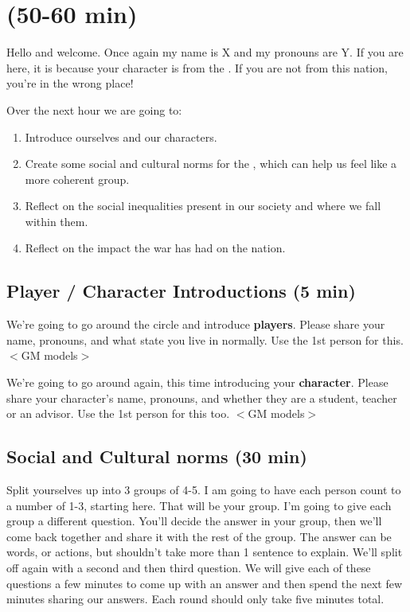 \documentclass[green]{GL2020}
\begin{document}
\name{\gPreGameCoS{}}

\section*{(50-60 min)}

Hello and welcome. Once again my name is X and my pronouns are Y. If you are here, it is because your character is from the \pFarm{}. If you are not from this nation, you're in the wrong place!

Over the next hour we are going to:
\begin{enumerate}
	\item Introduce ourselves and our characters.
	\item Create some social and cultural norms for the \pFarm{}, which can help us feel like a more coherent group.
	\item Reflect on the social inequalities present in our society and where we fall within them.
	\item Reflect on the impact the war has had on the nation.
\end{enumerate}

\subsection*{Player / Character Introductions (5 min)}
We’re going to go around the circle and introduce \textbf{players}. Please share your name, pronouns, and what state you live in normally. Use the 1st person for this. $<$GM models$>$

We’re going to go around again, this time introducing your \textbf{character}. Please share your character’s name, pronouns, and whether they are a student, teacher or an advisor. Use the 1st person for this too. $<$GM models$>$

\subsection*{Social and Cultural norms (30 min)}
Split yourselves up into 3 groups of 4-5. I am going to have each person count to a number of 1-3, starting here.  That will be your group.  I’m going to give each group a different question. You’ll decide the answer in your group, then we’ll come back together and share it with the rest of the group. The answer can be words, or actions, but shouldn't take more than 1 sentence to explain. We’ll split off again with a second and then third question. We will give each of these questions a few minutes to come up with an answer and then spend the next few minutes sharing our answers.  Each round should only take five minutes total.
\end{document}
